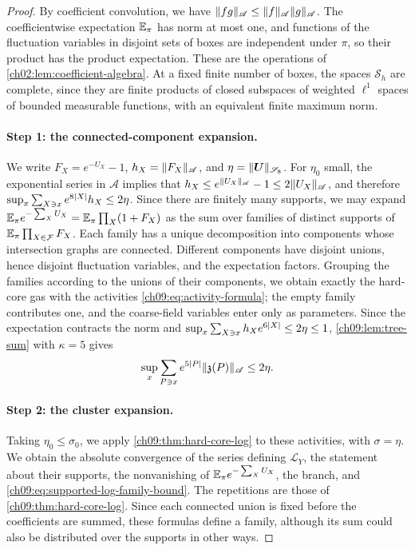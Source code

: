 \begin{proof}
By coefficient convolution, we have $\lVert fg\rVert_{\mathscr A}\le\lVert f\rVert_{\mathscr A}\lVert g\rVert_{\mathscr A}$. The coefficientwise expectation $\mathbb E_\pi$ has norm at most one, and functions of the fluctuation variables in disjoint sets of boxes are independent under $\pi$, so their product has the product expectation. These are the operations of \cref{ch02:lem:coefficient-algebra}. At a fixed finite number of boxes, the spaces $\mathscr S_h$ are complete, since they are finite products of closed subspaces of weighted $\ell^1$ spaces of bounded measurable functions, with an equivalent finite maximum norm.

\paragraph{Step 1: the connected-component expansion.}
We write $F_X=e^{-U_X}-1$, $h_X=\lVert F_X\rVert_{\mathscr A}$, and $\eta=\lVert \boldsymbol U\rVert_{\mathscr S_8}$. For $\eta_0$ small, the exponential series in $\mathscr A$ implies that $h_X\le e^{\lVert U_X\rVert_{\mathscr A}}-1\le2\lVert U_X\rVert_{\mathscr A}$, and therefore $\sup_x\sum_{X\ni x}e^{8\lvert X\rvert}h_X\le2\eta$. Since there are finitely many supports, we may expand $\mathbb E_\pi e^{-\sum_XU_X}=\mathbb E_\pi\prod_X(1+F_X)$ as the sum over families of distinct supports of $\mathbb E_\pi\prod_{X\in\mathcal F}F_X$. Each family has a unique decomposition into components whose intersection graphs are connected. Different components have disjoint unions, hence disjoint fluctuation variables, and the expectation factors. Grouping the families according to the unions of their components, we obtain exactly the hard-core gas with the activities \eqref{ch09:eq:activity-formula}; the empty family contributes one, and the coarse-field variables enter only as parameters. Since the expectation contracts the norm and $\sup_x\sum_{X\ni x}h_Xe^{6\lvert X\rvert}\le2\eta\le1$, \cref{ch09:lem:tree-sum} with $\kappa=5$ gives
\[
 \sup_x\sum_{P\ni x}e^{5\lvert P\rvert}\lVert \mathfrak z(P)\rVert_{\mathscr A}\le2\eta.
\]

\paragraph{Step 2: the cluster expansion.}
Taking $\eta_0\le\sigma_0$, we apply \cref{ch09:thm:hard-core-log} to these activities, with $\sigma=\eta$. We obtain the absolute convergence of the series defining $\mathcal L_Y$, the statement about their supports, the nonvanishing of $\mathbb E_\pi e^{-\sum_XU_X}$, the branch, and \eqref{ch09:eq:supported-log-family-bound}. The repetitions are those of \cref{ch09:thm:hard-core-log}. Since each connected union is fixed before the coefficients are summed, these formulas define a family, although its sum could also be distributed over the supports in other ways.


\end{proof}
